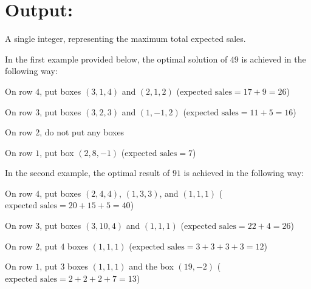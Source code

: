\section*{Output:}
A single integer, representing the maximum total expected sales.

In the first example provided below, the optimal solution of $49$ is
achieved in the following way:

On row $4$, put boxes $(3, 1, 4)$ and $(2, 1, 2)$ ($\text{expected sales}=17+9=26$)

On row $3$, put boxes $(3, 2, 3)$ and $(1, -1, 2)$ ($\text{expected sales}=11+5=16$)

On row $2$, do not put any boxes

On row $1$, put box $(2, 8, -1)$ ($\text{expected sales}=7$)

In the second example, the optimal result of $91$ is achieved in the
following way:

On row $4$, put boxes $(2, 4, 4)$, $(1, 3, 3)$, and $(1, 1, 1)$ ($\text{expected sales}=20+15+5=40$)

On row $3$, put boxes $(3, 10, 4)$ and $(1, 1, 1)$ ($\text{expected sales}=22+4=26$)

On row $2$, put $4$ boxes $(1, 1, 1)$ ($\text{expected sales}=3+3+3+3=12$)

On row $1$, put $3$ boxes $(1, 1, 1)$ and the box $(1 9, -2)$ ($\text{expected sales}=2+2+2+7=13$)


